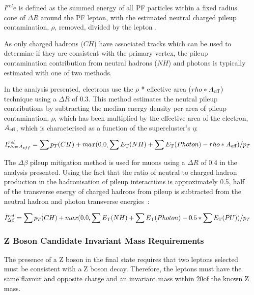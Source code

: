 $I^{rel}$e is defined as the summed energy of all PF particles within a fixed radius cone of $\Delta R$ around the PF lepton, with the estimated neutral charged pileup contamination, $\rho$, removed, divided by the lepton \pT.

As only charged hadrons ($CH$) have associated tracks which can be used to determine if they are consistent with the primary vertex, the pileup contamination contribution from neutral hadrons ($NH$) and photons is typically estimated with one of two methods.

In the analysis presented, electrons use the $\rho$ * effective area ($rho * A_{\rm eff}$) technique using a $\Delta R$ of 0.3.
This method estimates the neutral pileup contributions by subtracting the median energy density per area of pileup contamination, $\rho$, which has been multiplied by the effective area of the electron, $A_{\rm eff}$, which is characterised as a function of the supercluster's $\eta$:

\begin{equation}
I^{rel}_{rho * A_{eff}} = \sum p_T(CH) + max (0.0, \sum E_{\rm T}(NH) + \sum E_{\rm T}(Photon) -rho*A_{\rm eff} )/p_T \\
\end{equation}\label{eq:rhoEffA}

The $\Delta\beta$ pileup mitigation method is used for muons using a $\Delta R$ of 0.4 in the analysis presented.
Using the fact that the ratio of neutral to charged hadron production in the hadronisation of pileup interactions is approximately 0.5, half of the transverse energy of charged hadrons from pileup is subtracted from the neutral hadron and photon transverse energies~\cite{Chatrchyan:2012vp}:

\begin{equation}
I^{rel}_{\Delta\beta} = \sum p_T(CH) + max (0.0, \sum E_{\rm T}(NH) + \sum E_{\rm T}(Photon) - 0.5 * \sum E_{\rm T}(PU))/p_T \\
\end{equation}\label{eq:deltaBeta}

\subsubsection{Z Boson Candidate Invariant Mass Requirements}
The presence of a Z boson in the final state requires that two leptons selected must be consistent with a Z boson decay.
Therefore, the leptons must have the same flavour and opposite charge and an invariant mass within 20\GeVcc of the known Z mass.

